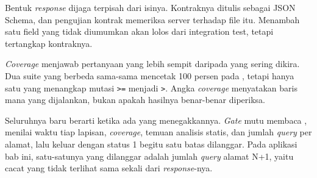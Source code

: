 Bentuk \textit{response} dijaga terpisah dari isinya. Kontraknya ditulis
sebagai JSON Schema, dan pengujian kontrak memeriksa server terhadap file
itu. Menambah satu field yang tidak diumumkan akan lolos dari integration
test, tetapi tertangkap kontraknya.

\textit{Coverage} menjawab pertanyaan yang lebih sempit daripada yang sering
dikira. Dua suite yang berbeda sama-sama mencetak 100 persen pada
, tetapi hanya satu yang menangkap mutasi \texttt{>=}
menjadi \texttt{>}. Angka \textit{coverage} menyatakan baris mana yang
dijalankan, bukan apakah hasilnya benar-benar diperiksa.

Seluruhnya baru berarti ketika ada yang menegakkannya. \textit{Gate} mutu membaca
, menilai waktu tiap lapisan, \textit{coverage}, temuan
analisis statis, dan jumlah \textit{query} per alamat, lalu keluar dengan
status 1 begitu satu batas dilanggar. Pada aplikasi bab ini, satu-satunya
yang dilanggar adalah jumlah \textit{query} alamat N+1, yaitu cacat yang
tidak terlihat sama sekali dari \textit{response}-nya.
